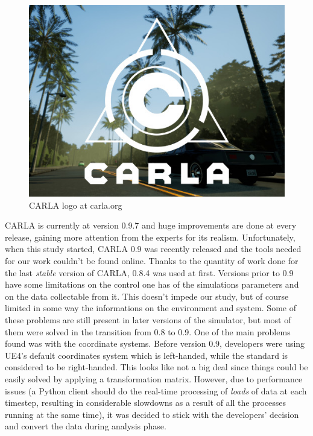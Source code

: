 \begin{figure}[h!]
	\includegraphics[width=\textwidth]{img/carla.jpg}
	\caption{CARLA logo at carla.org}
\end{figure}

CARLA is currently at version 0.9.7 and huge improvements are done at every release, gaining more attention from the experts for its realism. Unfortunately, when this study started, CARLA 0.9 was recently released and the tools needed for our work couldn't be found online. Thanks to the quantity of work done for the last \textit{stable} version of CARLA, 0.8.4 was used at first.\newline
Versions prior to 0.9 have some limitations on the control one has of the simulations parameters and on the data collectable from it. This doesn't impede our study, but of course limited in some way the informations on the environment and system. Some of these problems are still present in later versions of the simulator, but most of them were solved in the transition from 0.8 to 0.9.\newline\newline
One of the main problems found was with the coordinate systems. Before version 0.9, developers were using UE4's default coordinates system which is left-handed, while the standard is considered to be right-handed. This looks like not a big deal since things could be easily solved by applying a transformation matrix. However, due to performance issues (a Python client should do the real-time processing of \textsl{loads} of data at each timestep, resulting in considerable slowdowns as a result of all the processes running at the same time), it was decided to stick with the developers' decision and convert the data during analysis phase.

